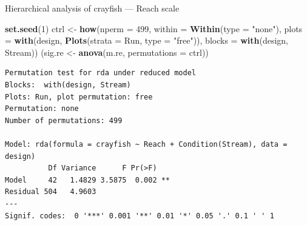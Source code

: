 \documentclass[10pt,ignorenonframetext,compress, aspectratio=169]{beamer}
\newenvironment{Shaded}{\begin{snugshade}}{\end{snugshade}}
\newcommand{\KeywordTok}[1]{\textcolor[rgb]{0.13,0.29,0.53}{\textbf{{#1}}}}
\newcommand{\DataTypeTok}[1]{\textcolor[rgb]{0.13,0.29,0.53}{{#1}}}
\newcommand{\DecValTok}[1]{\textcolor[rgb]{0.00,0.00,0.81}{{#1}}}
\newcommand{\StringTok}[1]{\textcolor[rgb]{0.31,0.60,0.02}{{#1}}}
\newcommand{\NormalTok}[1]{{#1}}
\begin{document}
\begin{frame}[fragile]{Hierarchical analysis of crayfish --- Reach
scale}

\scriptsize

\begin{Shaded}
\begin{Highlighting}[]
\KeywordTok{set.seed}\NormalTok{(}\DecValTok{1}\NormalTok{)}
\NormalTok{ctrl <-}\StringTok{ }\KeywordTok{how}\NormalTok{(}\DataTypeTok{nperm =} \DecValTok{499}\NormalTok{, }\DataTypeTok{within =} \KeywordTok{Within}\NormalTok{(}\DataTypeTok{type =} \StringTok{"none"}\NormalTok{),}
            \DataTypeTok{plots =} \KeywordTok{with}\NormalTok{(design, }\KeywordTok{Plots}\NormalTok{(}\DataTypeTok{strata =} \NormalTok{Run, }\DataTypeTok{type =} \StringTok{"free"}\NormalTok{)),}
            \DataTypeTok{blocks =} \KeywordTok{with}\NormalTok{(design, Stream))}
\NormalTok{(sig.re <-}\StringTok{ }\KeywordTok{anova}\NormalTok{(m.re, }\DataTypeTok{permutations =} \NormalTok{ctrl))}
\end{Highlighting}
\end{Shaded}

\begin{verbatim}
Permutation test for rda under reduced model
Blocks:  with(design, Stream) 
Plots: Run, plot permutation: free
Permutation: none
Number of permutations: 499

Model: rda(formula = crayfish ~ Reach + Condition(Stream), data = design)
          Df Variance      F Pr(>F)   
Model     42   1.4829 3.5875  0.002 **
Residual 504   4.9603                 
---
Signif. codes:  0 '***' 0.001 '**' 0.01 '*' 0.05 '.' 0.1 ' ' 1
\end{verbatim}

\normalsize

\end{frame}
\end{document}
